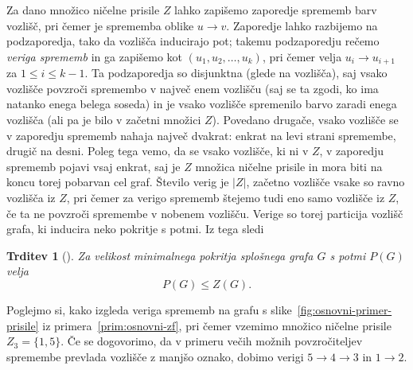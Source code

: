 \documentclass[12pt,a4paper,twoside]{article}
\theoremstyle{definition} %
\theoremstyle{plain} %
\newtheorem{trditev}[definicija]{Trditev}
\numberwithin{equation}{section}  %
\begin{document}
Za dano množico ničelne prisile $Z$ lahko zapišemo zaporedje sprememb barv vozlišč, pri čemer je sprememba oblike $u \rightarrow v$. Zaporedje lahko razbijemo na podzaporedja, tako da vozlišča inducirajo pot; takemu podzaporedju rečemo \emph{veriga sprememb} in ga zapišemo kot $(u_1, u_2, \ldots, u_k)$, pri čemer velja $u_i \rightarrow u_{i+1}$ za $1 \leq i \leq k-1$.  Ta podzaporedja so disjunktna (glede na vozlišča), saj vsako vozlišče povzroči spremembo v največ enem vozlišču (saj se ta zgodi, ko ima natanko enega belega soseda) in je vsako vozlišče spremenilo barvo zaradi enega vozlišča (ali pa je bilo v začetni množici $Z$). Povedano drugače, vsako vozlišče se v zaporedju sprememb nahaja največ dvakrat: enkrat na levi strani spremembe, drugič na desni. Poleg tega vemo, da se vsako vozlišče, ki ni v $Z$, v zaporedju sprememb pojavi vsaj enkrat, saj je $Z$ množica ničelne prisile in mora biti na koncu torej pobarvan cel graf. Število verig je $|Z|$, začetno vozlišče vsake so ravno vozlišča iz $Z$, pri čemer za verigo sprememb štejemo tudi eno samo vozlišče iz $Z$, če ta ne povzroči spremembe v nobenem vozlišču. Verige so torej particija vozlišč grafa, ki inducira neko pokritje s potmi. Iz tega sledi
\begin{trditev}[{\cite[trditev~2.10]{barioli2010zero}}]
    Za velikost minimalnega pokritja splošnega grafa $G$ s potmi $P(G)$ velja
    \begin{equation}
        \label{eq:neenakost-path-cover-zf}
        P(G) \leq Z(G).
    \end{equation}
\end{trditev}
Poglejmo si, kako izgleda veriga sprememb na grafu s slike~\ref{fig:osnovni-primer-prisile} iz primera~\ref{prim:osnovni-zf}, pri čemer vzemimo množico ničelne prisile $Z_3 = \{1,5\}$. Če se dogovorimo, da v primeru večih možnih povzročiteljev spremembe prevlada vozlišče z manjšo oznako, dobimo verigi $5 \rightarrow 4 \rightarrow 3$ in $1 \rightarrow 2$.
\end{document}

